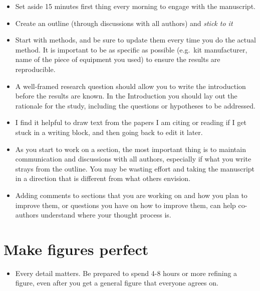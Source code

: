 \documentclass[
  letterpaper,
  DIV=11,
  numbers=noendperiod]{scrreprt}
\providecommand{\tightlist}{%
  \setlength{\itemsep}{0pt}\setlength{\parskip}{0pt}}\usepackage{longtable,booktabs,array}
\begin{document}
\begin{itemize}
\item
  Set aside 15 minutes first thing every morning to engage with the
  manuscript.
\item
  Create an outline (through discussions with all authors) and
  \emph{stick to it}
\item
  Start with methods, and be sure to update them every time you do the
  actual method. It is important to be as specific as possible (e.g.~kit
  manufacturer, name of the piece of equipment you used) to ensure the
  results are reproducible.
\item
  A well-framed research question should allow you to write the
  introduction before the results are known. In the Introduction you
  should lay out the rationale for the study, including the questions or
  hypotheses to be addressed.
\item
  I find it helpful to draw text from the papers I am citing or reading
  if I get stuck in a writing block, and then going back to edit it
  later.
\item
  As you start to work on a section, the most important thing is to
  maintain communication and discussions with all authors, especially if
  what you write strays from the outline. You may be wasting effort and
  taking the manuscript in a direction that is different from what
  others envision.
\item
  Adding comments to sections that you are working on and how you plan
  to improve them, or questions you have on how to improve them, can
  help co-authors understand where your thought process is.
\end{itemize}

\hypertarget{make-figures-perfect}{%
\section*{\texorpdfstring{\textbf{Make figures
perfect}}{Make figures perfect}}\label{make-figures-perfect}}


\begin{itemize}
\tightlist
\item
  Every detail matters. Be prepared to spend 4-8 hours or more refining
  a figure, even after you get a general figure that everyone agrees on.
\end{itemize}
\end{document}
